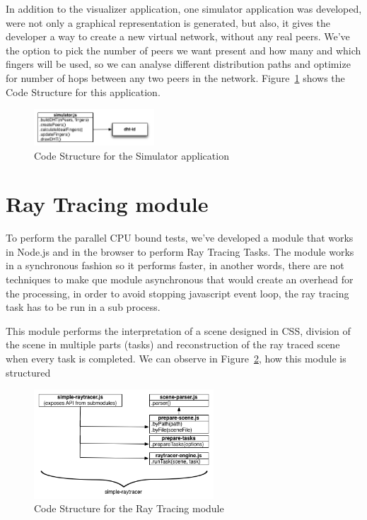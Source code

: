 In addition to the visualizer application, one simulator application was developed, were not only a graphical representation is generated, but also, it gives the developer a way to create a new virtual network, without any real peers. We've the option to pick the number of peers we want present and how many and which fingers will be used, so we can analyse different distribution paths and optimize for number of hops between any two peers in the network. Figure~\ref{fig:d-s} shows the Code Structure for this application.


\begin{figure}[h!]
  \centering
  \includegraphics[width=0.4\textwidth]{figs/diagram-simulator}
  \caption{Code Structure for the Simulator application}
  \label{fig:d-s}
\end{figure}

\section{Ray Tracing module}

To perform the parallel CPU bound tests, we've developed a module that works in Node.js and in the browser to perform Ray Tracing Tasks. The module works in a synchronous fashion so it performs faster, in another words, there are not techniques to make que module asynchronous that would create an overhead for the processing, in order to avoid stopping javascript event loop, the ray tracing task has to be run in a sub process.

This module performs the interpretation of a scene designed in CSS, division of the scene in multiple parts (tasks) and reconstruction of the ray traced scene when every task is completed. We can observe in Figure~\ref{fig:d-s-r}, how this module is structured

\begin{figure}[h!]
  \centering
  \includegraphics[width=0.6\textwidth]{figs/diagram-simple-raytracer}
  \caption{Code Structure for the Ray Tracing module}
  \label{fig:d-s-r}
\end{figure}

